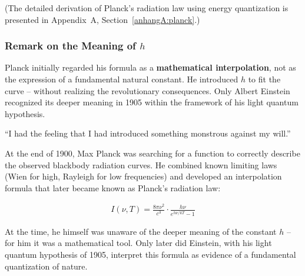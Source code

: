 (The detailed derivation of Planck’s radiation law using energy quantization is presented in Appendix~A, Section~\ref{anhangA:planck}.)

\subsubsection{Remark on the Meaning of \( h \)}

Planck initially regarded his formula as a \textbf{mathematical interpolation}, not as the expression of a fundamental natural constant. He introduced \( h \) to fit the curve – without realizing the revolutionary consequences. Only Albert Einstein recognized its deeper meaning in 1905 within the framework of his light quantum hypothesis.

\vspace{-0.3em}
\begin{tcolorbox}[physikbox,title={Max Planck – Scientific Autobiography \cite{planck1948}}]
	\label{box:planck-zitat}
	“I had the feeling that I had introduced something monstrous against my will.”
\end{tcolorbox}

\vspace{1em}
\begin{tcolorbox}[mathebox, title={Planck’s Radiation Law: A Mathematical Interpolation \cite{Hoffmann2008}}]
	\label{box:planck-interpolation}
	At the end of 1900, Max Planck was searching for a function to correctly describe the observed blackbody radiation curves. He combined known limiting laws (Wien for high, Rayleigh for low frequencies) and developed an interpolation formula that later became known as Planck’s radiation law:
	
	\begin{align}
		I(\nu, T) = \frac{8\pi \nu^2}{c^3} \cdot \frac{h\nu}{e^{h\nu/kT} - 1}
	\end{align}
	
	At the time, he himself was unaware of the deeper meaning of the constant \( h \) – for him it was a mathematical tool. Only later did Einstein, with his light quantum hypothesis of 1905, interpret this formula as evidence of a fundamental quantization of nature.
\end{tcolorbox}
\newpage
\noindent
